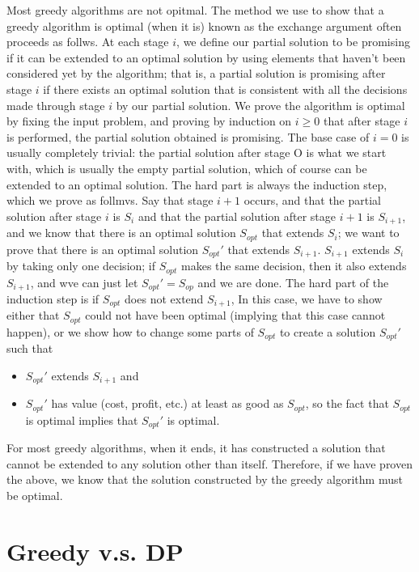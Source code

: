 Most greedy algorithms are not opitmal. The method we use to show that a greedy algorithm is optimal (when it is) known as the exchange argument often proceeds as follws. At each stage $i$, we define our partial solution to be promising if it can be extended to an optimal solution by using elements that haven't been considered yet by the algorithm; that is, a partial solution is promising after stage $i$ if there exists an optimal solution that is consistent with all the decisions made through stage $i$ by our partial solution. We prove the algorithm is optimal by fixing the input problem, and proving by induction on $i \geq 0$ that after stage $i$ is performed, the partial solution obtained is promising. The base case of $i=0$ is usually completely trivial: the partial solution after stage O is what we start with, which is usually the empty partial solution, which of course can be extended to an optimal solution. The hard part is always the induction step, which we prove as follmvs. Say that stage $i+1$ occurs, and that the partial solution after stage $i$ is $S_i$ and that the partial solution after stage $i+1$ is $S_{i+1}$, and we know that there is an optimal solution $S_{opt}$ that extends $S_i$; we want to prove that there is an optimal solution $S_{opt}'$ that extends $S_{i+1}$. $S_{i+1}$ extends $S_i$ by taking only one decision; if $S_{opt}$ makes the same decision, then it also extends $S_{i+1}$, and wve can just let $S_{opt}' = S_{op}$ and we are done. The hard part of the induction step is if $S_{opt}$ does not extend $S_{i+1}$, In this case, we have to show either that $S_{opt}$ could not have been optimal (implying that this case cannot happen), or we show how to change some parts of $S_{opt}$ to create a solution $S_{opt}'$ such that

\begin{itemize}
    \item $S_{opt}'$ extends $S_{i+1}$ and
    \item $S_{opt}'$ has value (cost, profit, etc.) at least as good as $S_{opt}$, so the fact that $S_{opt}$ is optimal implies that $S_{opt}'$ is optimal.
\end{itemize}

For most greedy algorithms, when it ends, it has constructed a solution that cannot be extended to any solution other than itself. Therefore, if we have proven the above, we know that the solution constructed by the greedy algorithm must be optimal.

\section{Greedy v.s. DP}

